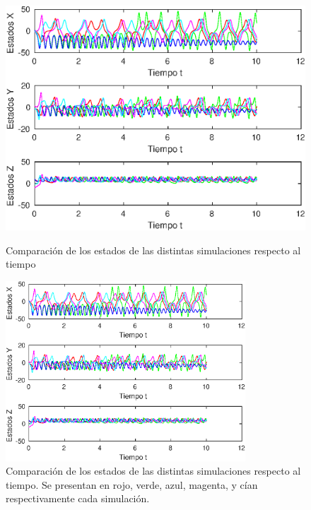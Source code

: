\documentclass[12pt,letterpaper]{article}
\begin{document}

\begin{figure}
	\centering

	\includegraphics[width=\textwidth]{pictures/comparacion}
	\caption{Comparación de los estados de las distintas simulaciones respecto al tiempo}

	\includegraphics[width=0.8\textwidth]{pictures/comparacion}
	\caption{Comparación de los estados de las distintas simulaciones respecto al tiempo. Se presentan en rojo, verde, azul, magenta, y cían respectivamente cada simulación.}

	\label{fig:comparacion}
\end{figure}
\end{document}
